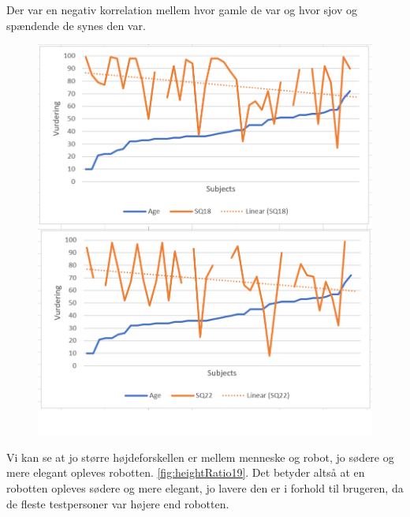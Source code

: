Der var en negativ korrelation mellem hvor gamle de var og hvor sjov og spændende de synes den var. 

\begin{figure}[H]
\centering
\includegraphics[width=\textwidth]{Figure/DatabehandlingSkalaer/Demografi/age18_22.png}
\caption{}
\label{fig:age18_22}
\end{figure}
\noindent

Vi kan se at jo større højdeforskellen er mellem menneske og robot, jo sødere og mere elegant opleves robotten. \autoref{fig:heightRatio19}. Det betyder altså at en robotten opleves sødere og mere elegant, jo lavere den er i forhold til brugeren, da de fleste testpersoner var højere end robotten.

